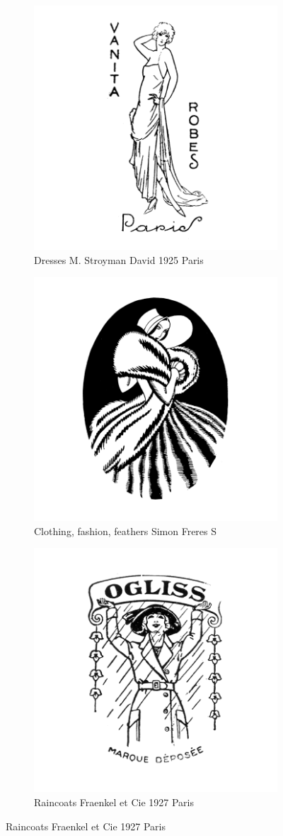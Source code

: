 \begin{figure}[h]
  \centering
  \begin{subfigure}{.45\textwidth}
    \centering
    \includegraphics[width=.5\linewidth]{images/supplement/trademarks/french/21_45}
    \caption[]{Dresses M. Stroyman David 1925 Paris}
    \label{fig:trademarks:french:21.45}
  \end{subfigure}

  \begin{subfigure}{.45\textwidth}
    \centering
    \includegraphics[width=.5\linewidth]{images/supplement/trademarks/french/21_52}
    \caption[]{Clothing, fashion, feathers Simon Freres S}
    \label{fig:trademarks:french:21.52}
  \end{subfigure}

  \begin{subfigure}{.45\textwidth}
    \centering
    \includegraphics[width=.5\linewidth]{images/supplement/trademarks/french/21_53}
    \caption[]{Raincoats Fraenkel et Cie 1927 Paris}
    \label{fig:trademarks:french:21.53}
  \end{subfigure}
\end{figure}
